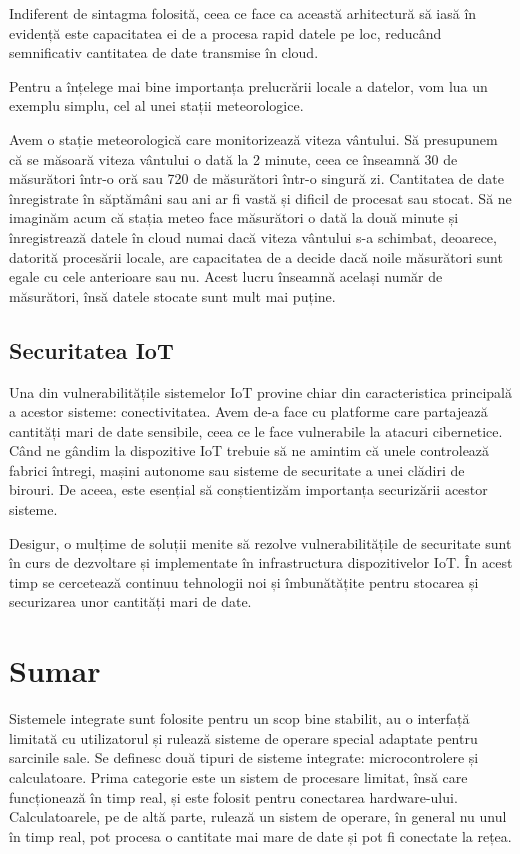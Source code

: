Indiferent de sintagma folosită, ceea ce face ca această arhitectură să iasă în
evidență este capacitatea ei de a procesa rapid datele pe loc, reducând
semnificativ cantitatea de date transmise în cloud.

Pentru a înțelege mai bine importanța prelucrării locale a datelor, vom lua un
exemplu simplu, cel al unei stații meteorologice.

Avem o stație meteorologică care monitorizează viteza vântului. Să presupunem că
se măsoară viteza vântului o dată la 2 minute, ceea ce înseamnă 30 de măsurători
într-o oră sau 720 de măsurători într-o singură zi. Cantitatea de date
înregistrate în săptămâni sau ani ar fi vastă și dificil de procesat sau stocat.
Să ne imaginăm acum că stația meteo face măsurători o dată la două minute și
înregistrează datele în cloud numai dacă viteza vântului s-a schimbat, deoarece,
datorită procesării locale, are capacitatea de a decide dacă noile măsurători
sunt egale cu cele anterioare sau nu. Acest lucru înseamnă același număr de
măsurători, însă datele stocate sunt mult mai puține.

\subsection{Securitatea IoT}
\label{sec:embed:iot:security}

Una din vulnerabilitățile sistemelor IoT provine chiar din caracteristica
principală a acestor sisteme: conectivitatea. Avem de-a face cu platforme care
partajează cantități mari de date sensibile, ceea ce le face vulnerabile la
atacuri cibernetice. Când ne gândim la dispozitive IoT trebuie să ne amintim
că unele controlează fabrici întregi, mașini autonome sau sisteme de
securitate a unei clădiri de birouri. De aceea, este esențial să conștientizăm
importanța securizării acestor sisteme.

Desigur, o mulțime de soluții menite să rezolve vulnerabilitățile de securitate
sunt în curs de dezvoltare și implementate în infrastructura dispozitivelor IoT.
În acest timp se cercetează continuu tehnologii noi și îmbunătățite pentru stocarea
și securizarea unor cantități mari de date.

\section{Sumar}
\label{sec:embed:summary}

Sistemele integrate sunt folosite pentru un scop bine stabilit, au o interfață
limitată cu utilizatorul și rulează sisteme de operare special adaptate pentru
sarcinile sale. Se definesc două tipuri de sisteme integrate: microcontrolere și
calculatoare. Prima categorie este un sistem de procesare limitat, însă care
funcționează în timp real, și este folosit pentru conectarea hardware-ului.
Calculatoarele, pe de altă parte, rulează un sistem de operare, în general nu unul
în timp real, pot procesa o cantitate mai mare de date și pot fi conectate la
rețea.


